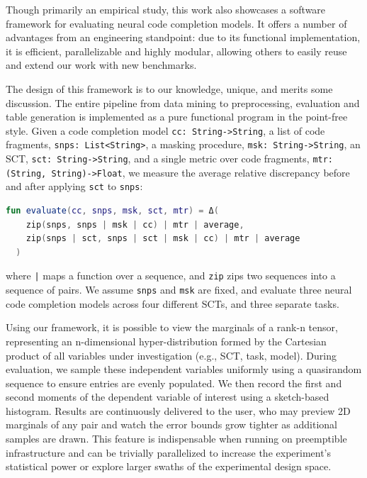 \documentclass[usenames,dvipsnames]{article} %
\begin{document}
  Though primarily an empirical study, this work also showcases a software framework for evaluating neural code completion models. It offers a number of advantages from an engineering standpoint: due to its functional implementation, it is efficient, parallelizable and highly modular, allowing others to easily reuse and extend our work with new benchmarks.

  The design of this framework is to our knowledge, unique, and merits some discussion. The entire pipeline from data mining to preprocessing, evaluation and table generation is implemented as a pure functional program in the point-free style. Given a code completion model \lstinline|cc: String->String|, a list of code fragments, \lstinline|snps: List<String>|, a masking procedure, \lstinline|msk: String->String|, an SCT, \lstinline|sct: String->String|, and a single metric over code fragments, \lstinline|mtr: (String, String)->Float|, we measure the average relative discrepancy before and after applying \lstinline|sct| to \lstinline|snps|:

  \noindent\begin{lstlisting}[basicstyle=\footnotesize\ttfamily, language=kotlin,label={lst:lstlisting}]
  fun evaluate(cc, snps, msk, sct, mtr) = Δ(
    zip(snps, snps | msk | cc) | mtr | average,
    zip(snps | sct, snps | sct | msk | cc) | mtr | average
  )
  \end{lstlisting}

  \noindent where \texttt{|} maps a function over a sequence, and \lstinline|zip| zips two sequences into a sequence of pairs. We assume \lstinline|snps| and \lstinline|msk| are fixed, and evaluate three neural code completion models across four different SCTs, and three separate tasks.

  Using our framework, it is possible to view the marginals of a rank-n tensor, representing an n-dimensional hyper-distribution formed by the Cartesian product of all variables under investigation (e.g., SCT, task, model). During evaluation, we sample these independent variables uniformly using a quasirandom sequence to ensure entries are evenly populated. We then record the first and second moments of the dependent variable of interest using a sketch-based histogram. Results are continuously delivered to the user, who may preview 2D marginals of any pair and watch the error bounds grow tighter as additional samples are drawn. This feature is indispensable when running on preemptible infrastructure and can be trivially parallelized to increase the experiment's statistical power or explore larger swaths of the experimental design space.
\end{document}
